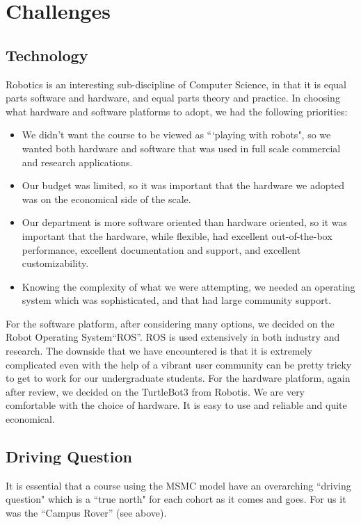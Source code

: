 \section{Challenges}

\subsection{Technology} Robotics is an interesting sub-discipline of Computer Science, in that it is equal parts software and hardware, and equal parts theory and practice. In choosing what hardware and software platforms to adopt, we had the following priorities:
\begin{itemize}
    \item We didn't want the course to be viewed as ```playing with robots", so we wanted both hardware and software that was used in full scale commercial and research applications. 
    \item Our budget was limited, so it was important that the hardware we adopted was on the economical side of the scale.
    \item Our department is more software oriented than hardware oriented, so it was important that the hardware, while flexible, had excellent out-of-the-box performance, excellent documentation and support, and excellent customizability.
    \item Knowing the complexity of what we were attempting, we needed an operating system which was sophisticated, and that had large community support.
\end{itemize}
For the software platform, after considering many options, we decided on the Robot Operating System``ROS''\cite{ROS}. ROS is used extensively in both industry and research. The downside that we have encountered is that it is extremely complicated even with the help of a vibrant user community can be pretty tricky to get to work for our undergraduate students. For the hardware platform, again after review, we decided on the TurtleBot3\cite{Turtle} from Robotis. We are very comfortable with the choice of hardware. It is easy to use and reliable and quite economical.

\subsection{Driving Question} It is essential that a course using the MSMC model have an overarching ``driving question" which is a ``true north" for each cohort as it comes and goes. For us it was the ``Campus Rover'' (see above). 

